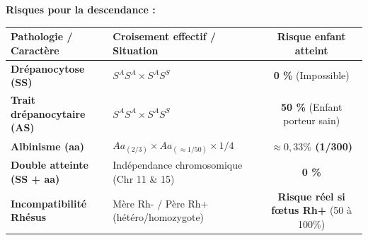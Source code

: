 \documentclass[11pt]{article}
\begin{document}
\begin{exoresolu}
\textbf{Risques pour la descendance :}
\begin{center}
\begin{tabularx}{\linewidth}{|l|X|c|}\hline
\rowcolor{popblueL} \textbf{Pathologie / Caractère} & \textbf{Croisement effectif / Situation} & \textbf{Risque enfant atteint} \\ \hline
\textbf{Drépanocytose (SS)} & $S^A S^A \times S^A S^S$ & \textbf{0 \%} (Impossible) \\ \hline
\textbf{Trait drépanocytaire (AS)} & $S^A S^A \times S^A S^S$ & \textbf{50 \%} (Enfant porteur sain) \\ \hline
\textbf{Albinisme (aa)} & $Aa_{(2/3)} \times Aa_{(\approx 1/50)} \times 1/4$ & \textbf{$\approx 0,33 \%$ (1/300)} \\ \hline
\textbf{Double atteinte (SS + aa)} & Indépendance chromosomique (Chr 11 \& 15) & \textbf{0 \%} \\ \hline
\textbf{Incompatibilité Rhésus} & Mère Rh- / Père Rh+ (hétéro/homozygote) & \textbf{Risque réel si fœtus Rh+} (50 à 100\%) \\ \hline
\end{tabularx}
\end{center}


\end{exoresolu}
\end{document}
